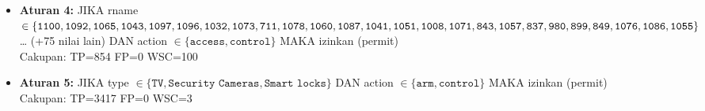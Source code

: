 \begin{itemize}
    \item \textbf{Aturan 4:} JIKA \textsf{rname} $\in \{\texttt{1100}, \texttt{1092}, \texttt{1065}, \texttt{1043}, \texttt{1097}, \texttt{1096}, \texttt{1032}, \\\texttt{1073}, \texttt{711}, \texttt{1078}, \texttt{1060}, \texttt{1087}, \texttt{1041}, \texttt{1051}, \texttt{1008}, \texttt{1071}, \texttt{843}, \texttt{1057}, \\\texttt{837}, \texttt{980}, \texttt{899}, \texttt{849}, \texttt{1076}, \texttt{1086}, \texttt{1055}\}$ … (+75 nilai lain) DAN \textsf{action} $\in \{\texttt{access}, \texttt{control}\}$ MAKA izinkan (permit) \\
    \hspace*{1cm} Cakupan: TP=854  FP=0  WSC=100

    \item \textbf{Aturan 5:} JIKA \textsf{type} $\in \{\texttt{TV}, \texttt{Security Cameras}, \texttt{Smart locks}\}$ DAN \textsf{action} $\in \{\texttt{arm}, \texttt{control}\}$ MAKA izinkan (permit) \\
    \hspace*{1cm} Cakupan: TP=3417  FP=0  WSC=3

\end{itemize}